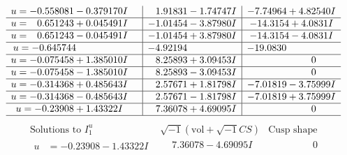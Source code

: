 \documentclass[1p]{elsarticle_modified}
\theoremstyle{definition}
\newcommand{\I}{\sqrt{-1}}
\begin{document}
$$\begin{array}{c|c|c}
\begin{aligned}
u &= -0.558081 - 0.379170 I\end{aligned}
 & \phantom{-}1.91831 - 1.74747 I & -7.74964 + 4.82540 I \\ \hline\begin{aligned}
u &= \phantom{-}0.651243 + 0.045491 I\end{aligned}
 & -1.01454 - 3.87980 I & -14.3154 + 4.0831 I \\ \hline\begin{aligned}
u &= \phantom{-}0.651243 - 0.045491 I\end{aligned}
 & -1.01454 + 3.87980 I & -14.3154 - 4.0831 I \\ \hline\begin{aligned}
u &= -0.645744\phantom{ +0.000000I}\end{aligned}
 & -4.92194\phantom{ +0.000000I} & -19.0830\phantom{ +0.000000I} \\ \hline\begin{aligned}
u &= -0.075458 + 1.385010 I\end{aligned}
 & \phantom{-}8.25893 + 3.09453 I & \phantom{-0.000000 } 0 \\ \hline\begin{aligned}
u &= -0.075458 - 1.385010 I\end{aligned}
 & \phantom{-}8.25893 - 3.09453 I & \phantom{-0.000000 } 0 \\ \hline\begin{aligned}
u &= -0.314368 + 0.485643 I\end{aligned}
 & \phantom{-}2.57671 + 1.81798 I & -7.01819 - 3.75999 I \\ \hline\begin{aligned}
u &= -0.314368 - 0.485643 I\end{aligned}
 & \phantom{-}2.57671 - 1.81798 I & -7.01819 + 3.75999 I \\ \hline\begin{aligned}
u &= -0.23908 + 1.43322 I\end{aligned}
 & \phantom{-}7.36078 + 4.69095 I & \phantom{-0.000000 } 0\\
 \hline 
 \end{array}$$\newpage$$\begin{array}{c|c|c}  
\text{Solutions to }I^u_{1}& \I (\text{vol} + \sqrt{-1}CS) & \text{Cusp shape}\\
 \hline 
\begin{aligned}
u &= -0.23908 - 1.43322 I\end{aligned}
 & \phantom{-}7.36078 - 4.69095 I & \phantom{-0.000000 } 0 \\ \hline\begin{aligned}

\end{aligned}
\end{array}$$
\end{document}
